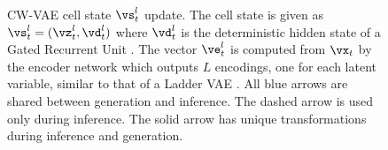 \begin{figure}[t!]
    \centering
    \def\col{blue}
\caption{CW-VAE cell state $\vs_t^l$ update. The cell state is given as $\vs_t^l=(\vz_t^l, \vd_t^l)$ where $\vd_t^l$ is the deterministic hidden state of a Gated Recurrent Unit \cite{cho_properties_2014}. The vector $\ve_t^l$ is computed from $\vx_t$ by the encoder network which outputs $L$ encodings, one for each latent variable, similar to that of a Ladder VAE \cite{sonderby_ladder_2016}. All blue arrows are shared between generation and inference. The dashed arrow is used only during inference. The solid arrow has unique transformations during inference and generation.}
\label{fig: cwvae cell state graph}
\end{figure}


